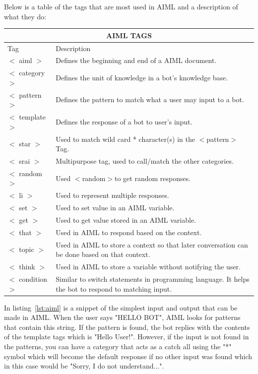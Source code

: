 Below is a table of the tags that are most used in AIML and a description of what they do:\cite{aimltuto63:online}\cite{wallace2003elements}
\newline
\begin{tabular}{ |p{3cm}|p{10cm}|  }
\hline
\multicolumn{2}{|c|}{AIML TAGS} \\
\hline
Tag & Description \\
\hline
$<$ aiml $>$ & Defines the beginning and end of a AIML document. \\
\hline
$<$ category $>$ & Defines the unit of knowledge in a bot's knowledge base. \\
\hline
$<$ pattern $>$ & Defines the pattern to match what a user may input to a bot. \\
\hline
$<$ template $>$ & Defines the response of a bot to user's input. \\
\hline
$<$ star $>$ & Used to match wild card * character(s) in the $<$pattern$>$ Tag. \\
\hline
$<$ srai $>$ & Multipurpose tag, used to call/match the other categories. \\
\hline
$<$ random $>$ & Used $<$random$>$to get random responses. \\
\hline
$<$ li $>$ & Used to represent multiple responses. \\
\hline
$<$ set $>$ & Used to set value in an AIML variable. \\
\hline
$<$ get $>$ & Used to get value stored in an AIML variable. \\
\hline
$<$ that $>$ & Used in AIML to respond based on the context. \\
\hline
$<$ topic $>$ & Used in AIML to store a context so that later conversation can be done based on
that context. \\
\hline
$<$ think $>$ & Used in AIML to store a variable without notifying the user. \\
\hline
$<$ condition $>$ & Similar to switch statements in programming language. It helps the bot to respond
to matching input.\\
\hline
\end{tabular}
\newline
\newline

In listing~\ref{lst:aiml} is a snippet of the simplest input and output that can be made in AIML. When the user says "HELLO BOT", AIML looks for patterns that contain this string. If the pattern is found, the bot replies with the contents of the template tags which is "Hello User!". However, if the input is not found in the patterns, you can have a category that acts as a catch all using the "*" symbol which will become the default response if no other input was found which in this case would be "Sorry, I do not understand...".

